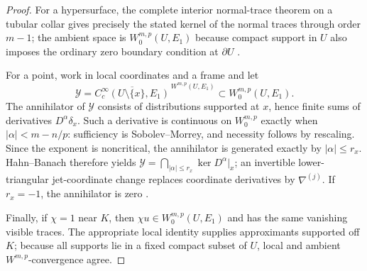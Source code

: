 \documentclass[11pt]{article}
\theoremstyle{plain}
\theoremstyle{definition}
\begin{document}
\begin{proof}
For a hypersurface, the complete interior normal-trace theorem on a tubular collar gives precisely the stated kernel of the normal traces through order \(m-1\); the ambient space is \(W_0^{m,p}(U,E_1)\) because compact support in \(U\) also imposes the ordinary zero boundary condition at \(\partial U\) \citep{LionsMagenes1972,Triebel1992,GrosseSchneider2013,Leoni2017Sobolev}.

For a point, work in local coordinates and a frame and let
\[
 \mathcal Y=\overline{C_c^\infty(U\setminus\{x\},E_1)}^{\,W^{m,p}(U,E_1)}\subset W_0^{m,p}(U,E_1).
\]
The annihilator of \(\mathcal Y\) consists of distributions supported at \(x\), hence finite sums of derivatives \(D^\alpha\delta_x\). Such a derivative is continuous on \(W_0^{m,p}\) exactly when \(|\alpha|<m-n/p\): sufficiency is Sobolev--Morrey, and necessity follows by rescaling. Since the exponent is noncritical, the annihilator is generated exactly by \(|\alpha|\le r_x\). Hahn--Banach therefore yields \(\mathcal Y=\bigcap_{|\alpha|\le r_x}\ker D^\alpha|_x\); an invertible lower-triangular jet-coordinate change replaces coordinate derivatives by \(\nabla^{(j)}\). If \(r_x=-1\), the annihilator is zero \citep{AdamsFournier2003,Mazya2011Sobolev,AdamsHedberg1996}.

Finally, if \(\chi=1\) near \(K\), then \(\chi u\in W_0^{m,p}(U,E_1)\) and has the same vanishing visible traces. The appropriate local identity supplies approximants supported off \(K\); because all supports lie in a fixed compact subset of \(U\), local and ambient \(W^{m,p}\)-convergence agree.
\end{proof}
\end{document}
